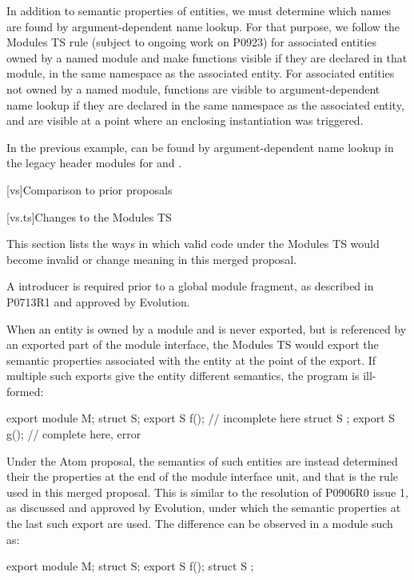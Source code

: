 \pnum
In addition to semantic properties of entities,
we must determine which names are found by
argument-dependent name lookup.
For that purpose,
we follow the Modules TS rule
(subject to ongoing work on P0923)
for associated entities owned by a named module
and make functions visible
if they are declared in that module,
in the same namespace as the associated entity.
For associated entities not owned by a named module,
functions are visible to
argument-dependent name lookup
if they are declared
in the same namespace as the associated entity,
and are visible at a point where
an enclosing instantiation
was triggered.
\begin{example}
In the previous example,
 can be found by
argument-dependent name lookup
in the legacy header modules for
 and
.
\end{example}

[vs]{Comparison to prior proposals}

[vs.ts]{Changes to the Modules TS}

\pnum
This section lists the ways in which valid code under the Modules TS
would become invalid or change meaning in this merged proposal.

\pnum
A  introducer is required prior to a global module fragment,
as described in P0713R1 and approved by Evolution.

\pnum
When an entity is owned by a module and is never exported,
but is referenced by an exported part of the module interface,
the Modules TS would export the semantic properties
associated with the entity at the point of the export.
If multiple such exports give the entity different semantics,
the program is ill-formed:

\begin{codeblock}
export module M;
struct S;
export S f();  //  incomplete here
struct S {};
export S g();  //  complete here, error
\end{codeblock}

Under the Atom proposal,
the semantics of such entities
are instead determined their the properties
at the end of the module interface unit,
and that is the rule used in this merged proposal.
This is similar to the resolution of P0906R0 issue 1,
as discussed and approved by Evolution,
under which the semantic properties at the last such export are used.
The difference can be observed in a module such as:

\begin{codeblock}
export module M;
struct S;
export S f();
struct S {};
\end{codeblock}

